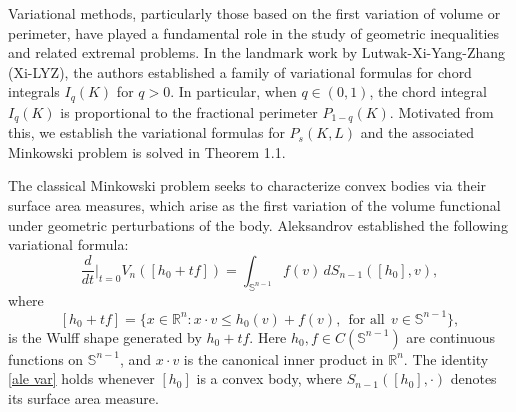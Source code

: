 \documentclass[12pt, oneside,reqno]{amsart}
\numberwithin{equation}{section}
\newtheorem{definition and theorem}[theorem]{Definition and Theorem}
\theoremstyle{plain}
\theoremstyle{remark}
\theoremstyle{definition}
\newcommand{\sn}{{\mathbb S}^{n-1}}
\newcommand{\rn}{\mathbb R^n}
\begin{document}





Variational methods, particularly those based on the first variation of volume or perimeter, have played a fundamental role in the study of geometric inequalities and related extremal problems. In the landmark work \cite{LXYZ2020} by Lutwak-Xi-Yang-Zhang (Xi-LYZ), the authors established a family of variational formulas for chord integrals $I_q(K)$ for $q>0$. In particular, when $q\in(0,1)$, the chord integral $I_q(K)$ is proportional to the fractional perimeter $P_{1-q}(K)$. Motivated from this, we establish the variational formulas for $P_s(K,L)$ and the associated Minkowski problem is solved in Theorem 1.1.


The classical Minkowski problem seeks to characterize convex bodies via their surface area measures, which arise as the first variation of the volume functional under geometric perturbations of the body. Aleksandrov \cite{Ale} established the following variational formula:
\begin{equation}\label{ale var}
    \frac{d}{dt} \Big|_{t=0} V_n([h_0+tf]) = \int_{\sn} f(v) \, dS_{n-1}([h_0], v),
\end{equation}
where 
\[[h_0+tf]=\{x\in\rn:  x\cdot v \leq h_0(v)+f(v),~~\text{for all}~~v\in\sn\},\]
is the Wulff shape generated by $h_0+tf$. Here $h_0, f\in C(\sn)$ are continuous functions on $\sn$, and  $ x\cdot v$ is the canonical inner product in $\rn$. The identity \eqref{ale var} holds whenever $[h_0]$ is a convex body, where $S_{n-1}([h_0],\cdot)$ denotes its surface area measure.


\vskip 6pt
\end{document}
